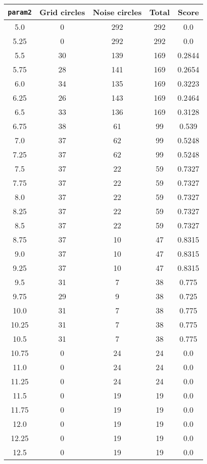 \documentclass[letterpaper, 12pt]{article}
\begin{document}
\begin{longtable}{|c|c|c|c|c|}
\hline
\textbf{\texttt{param2}} & \textbf{Grid circles} & \textbf{Noise circles} & \textbf{Total} & \textbf{Score} \\
\hline
5.0 & 0 & 292 & 292 & 0.0 \\
\hline
5.25 & 0 & 292 & 292 & 0.0 \\
\hline
5.5 & 30 & 139 & 169 & 0.2844 \\
\hline
5.75 & 28 & 141 & 169 & 0.2654 \\
\hline
6.0 & 34 & 135 & 169 & 0.3223 \\
\hline
6.25 & 26 & 143 & 169 & 0.2464 \\
\hline
6.5 & 33 & 136 & 169 & 0.3128 \\
\hline
6.75 & 38 & 61 & 99 & 0.539 \\
\hline
7.0 & 37 & 62 & 99 & 0.5248 \\
\hline
7.25 & 37 & 62 & 99 & 0.5248 \\
\hline
7.5 & 37 & 22 & 59 & 0.7327 \\
\hline
7.75 & 37 & 22 & 59 & 0.7327 \\
\hline
8.0 & 37 & 22 & 59 & 0.7327 \\
\hline
8.25 & 37 & 22 & 59 & 0.7327 \\
\hline
8.5 & 37 & 22 & 59 & 0.7327 \\
\hline
8.75 & 37 & 10 & 47 & 0.8315 \\
\hline
9.0 & 37 & 10 & 47 & 0.8315 \\
\hline
9.25 & 37 & 10 & 47 & 0.8315 \\
\hline
9.5 & 31 & 7 & 38 & 0.775 \\
\hline
9.75 & 29 & 9 & 38 & 0.725 \\
\hline
10.0 & 31 & 7 & 38 & 0.775 \\
\hline
10.25 & 31 & 7 & 38 & 0.775 \\
\hline
10.5 & 31 & 7 & 38 & 0.775 \\
\hline
10.75 & 0 & 24 & 24 & 0.0 \\
\hline
11.0 & 0 & 24 & 24 & 0.0 \\
\hline
11.25 & 0 & 24 & 24 & 0.0 \\
\hline
11.5 & 0 & 19 & 19 & 0.0 \\
\hline
11.75 & 0 & 19 & 19 & 0.0 \\
\hline
12.0 & 0 & 19 & 19 & 0.0 \\
\hline
12.25 & 0 & 19 & 19 & 0.0 \\
\hline
12.5 & 0 & 19 & 19 & 0.0 \\

\end{longtable}
\end{document}
